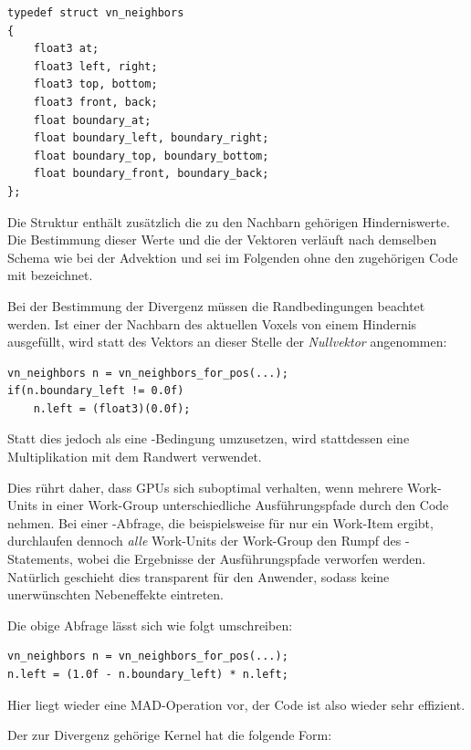 \begin{verbatim}
typedef struct vn_neighbors
{
    float3 at;
    float3 left, right;
    float3 top, bottom;
    float3 front, back;
    float boundary_at;
    float boundary_left, boundary_right;
    float boundary_top, boundary_bottom;
    float boundary_front, boundary_back;
};
\end{verbatim}

Die Struktur enthält zusätzlich die zu den Nachbarn gehörigen
Hinderniswerte. Die Bestimmung dieser Werte und die der Vektoren
verläuft nach demselben Schema wie bei der Advektion und sei im
Folgenden ohne den zugehörigen Code mit
  bezeichnet.

Bei der Bestimmung der Divergenz müssen die Randbedingungen beachtet
werden. Ist einer der Nachbarn des aktuellen Voxels von einem
Hindernis ausgefüllt, wird statt des Vektors an dieser Stelle der
\emph{Nullvektor} angenommen:
\begin{verbatim}
vn_neighbors n = vn_neighbors_for_pos(...);
if(n.boundary_left != 0.0f)
    n.left = (float3)(0.0f);
\end{verbatim}
Statt dies jedoch als eine -Bedingung
umzusetzen, wird stattdessen eine Multiplikation mit dem Randwert
verwendet.

Dies rührt daher, dass GPUs sich suboptimal verhalten, wenn mehrere
Work-Units in einer Work-Group unterschiedliche Ausführungspfade durch
den Code nehmen. Bei einer -Abfrage, die
beispielsweise für nur ein Work-Item  ergibt,
durchlaufen dennoch \emph{alle} Work-Units der Work-Group den Rumpf
des -Statements, wobei die Ergebnisse der
 Ausführungspfade verworfen werden. Natürlich
geschieht dies transparent für den Anwender, sodass keine
unerwünschten Nebeneffekte eintreten.

Die obige Abfrage lässt sich wie folgt umschreiben:

\begin{verbatim}
vn_neighbors n = vn_neighbors_for_pos(...);
n.left = (1.0f - n.boundary_left) * n.left;
\end{verbatim}

Hier liegt wieder eine MAD-Operation vor, der Code ist also wieder
sehr effizient.

Der zur Divergenz gehörige Kernel hat die folgende Form:

